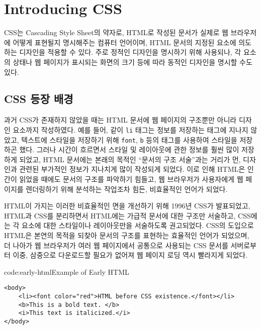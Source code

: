 \section{Introducing CSS} \label{sect:introducing-css}

CSS는 Cascading Style Sheet의 약자로, HTML로 작성된 문서가 실제로 웹 브라우저에 어떻게 표현될지 명시해주는 컴퓨터 언어이며, HTML 문서의 지정된 요소에 의도하는 디자인을 적용할 수 있다. 주로 정적인 디자인을 명시하기 위해 사용되나, 각 요소의 상태나 웹 페이지가 표시되는 화면의 크기 등에 따라 동적인 디자인을 명시할 수도 있다.

\subsection*{CSS 등장 배경}
과거 CSS가 존재하지 않았을 때는 HTML 문서에 웹 페이지의 구조뿐만 아니라 디자인 요소까지 작성하였다. 예를 들어, \과 같이 \texttt{li} 태그는 정보를 저장하는 태그에 지나지 않았고, 텍스트에 스타일을 저장하기 위해 \texttt{font}, \texttt{b} 등의 태그를 사용하여 스타일을 저장하곤 했다. 그러나 시간이 흐르면서 스타일 및 레이아웃에 관한 정보를 훨씬 많이 저장하게 되었고, HTML 문서에는 본래의 목적인 ``문서의 구조 서술''과는 거리가 먼, 디자인과 관련된 부가적인 정보가 지나치게 많이 작성되게 되었다. 이로 인해 HTML은 인간이 읽었을 때에도 문서의 구조를 파악하기 힘들고, 웹 브라우저가 사용자에게 웹 페이지를 렌더링하기 위해 분석하는 작업조차 힘든, 비효율적인 언어가 되었다. 

HTML이 가지는 이러한 비효율적인 면을 개선하기 위해 1996년 CSS가 발표되었고, HTML과 CSS를 분리하면서 HTML에는 가급적 문서에 대한 구조만 서술하고, CSS에는 각 요소에 대한 스타일이나 레이아웃만을 서술하도록 권고되었다. CSS의 도입으로 HTML은 본연의 목적을 되찾아 문서의 구조를 표현하는 효율적인 언어가 되었으며, 더 나아가 웹 브라우저가 여러 웹 페이지에서 공통으로 사용되는 CSS 문서를 서버로부터 이중, 삼중으로 다운로드할 필요가 없어져 웹 페이지 로딩 역시 빨라지게 되었다.

\begin{codeenv}{code:early-html}{Example of Early HTML}\begin{verbatim}
<body>
    <li><font color="red">HTML before CSS existence.</font></li>
    <b>This is a bold text. </b>
    <i>This text is italicized.</i>
</body>
\end{verbatim}
\end{codeenv}
